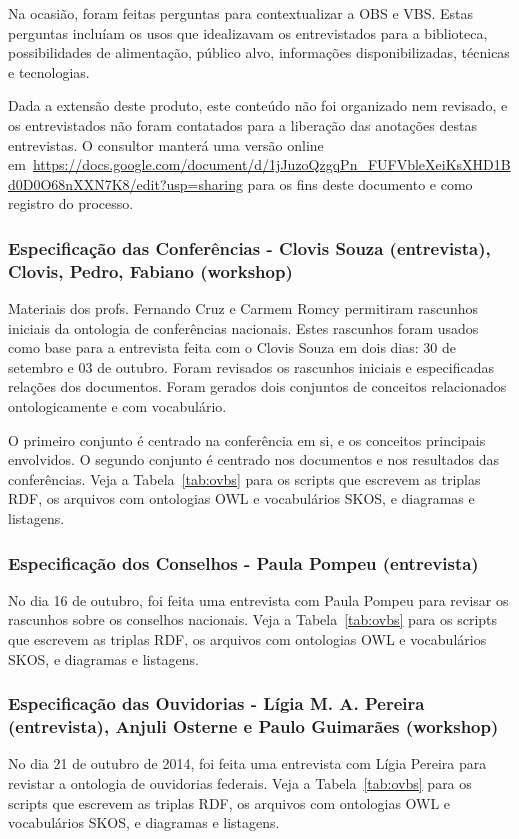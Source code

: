 \documentclass[12pt]{article}
\begin{document}
Na ocasião, foram feitas perguntas para contextualizar a OBS e VBS. Estas perguntas incluíam os usos que idealizavam os entrevistados para a biblioteca, possibilidades de alimentação, público alvo, informações disponibilizadas, técnicas e tecnologias.

Dada a extensão deste produto, este conteúdo não foi organizado nem revisado, e os entrevistados não foram contatados para a liberação das anotações destas entrevistas. O consultor manterá uma versão online em~\url{https://docs.google.com/document/d/1jJuzoQzgqPn_FUFVbleXeiKsXHD1Bd0D0O68nXXN7K8/edit?usp=sharing} para os fins deste documento e como registro do processo.

\subsubsection{Especificação das Conferências - Clovis Souza (entrevista), Clovis, Pedro, Fabiano (workshop)}
Materiais dos profs. Fernando Cruz e Carmem Romcy permitiram rascunhos iniciais da ontologia de conferências nacionais. Estes rascunhos foram usados como base para a entrevista feita com o Clovis Souza em dois dias: 30 de setembro e 03 de outubro. Foram revisados os rascunhos iniciais e especificadas relações dos documentos. Foram gerados dois conjuntos de conceitos relacionados ontologicamente e com vocabulário.

O primeiro conjunto é centrado na conferência em si, e os conceitos principais envolvidos. O segundo conjunto é centrado nos documentos e nos resultados das conferências. Veja a Tabela~\ref{tab:ovbs} para os scripts que escrevem as triplas RDF, os arquivos com ontologias OWL e vocabulários SKOS, e diagramas e listagens.

\subsubsection{Especificação dos Conselhos - Paula Pompeu (entrevista)}
No dia 16 de outubro, foi feita uma entrevista com Paula Pompeu para revisar os rascunhos sobre os conselhos nacionais.
Veja a Tabela~\ref{tab:ovbs} para os scripts que escrevem as triplas RDF, os arquivos com ontologias OWL e vocabulários SKOS, e diagramas e listagens.

\subsubsection{Especificação das Ouvidorias - Lígia M. A. Pereira (entrevista), Anjuli Osterne e Paulo Guimarães (workshop)}
No dia 21 de outubro de 2014, foi feita uma entrevista com Lígia Pereira para revistar a ontologia de ouvidorias federais.
Veja a Tabela~\ref{tab:ovbs} para os scripts que escrevem as triplas RDF, os arquivos com ontologias OWL e vocabulários SKOS, e diagramas e listagens.
\end{document}
